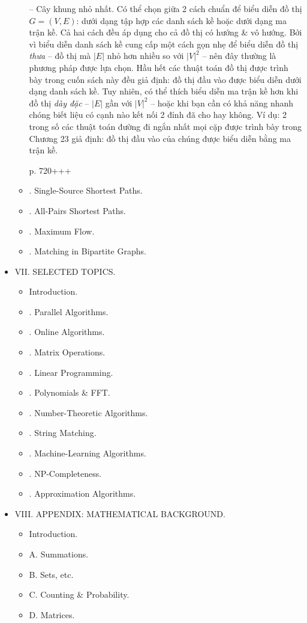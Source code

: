 \documentclass{article}
\begin{document}
\begin{itemize}
\begin{itemize}
		-- {\sf Cây khung nhỏ nhất.} Có thể chọn giữa 2 cách chuẩn để biểu diễn đồ thị $G = (V,E)$: dưới dạng tập hợp các danh sách kề hoặc dưới dạng ma trận kề. Cả hai cách đều áp dụng cho cả đồ thị có hướng \& vô hướng. Bởi vì biểu diễn danh sách kề cung cấp một cách gọn nhẹ để biểu diễn đồ thị {\it thưa} -- đồ thị mà $|E|$ nhỏ hơn nhiều so với $|V|^2$ -- nên đây thường là phương pháp được lựa chọn. Hầu hết các thuật toán đồ thị được trình bày trong cuốn sách này đều giả định: đồ thị đầu vào được biểu diễn dưới dạng danh sách kề. Tuy nhiên, có thể thích biểu diễn ma trận kề hơn khi đồ thị {\it dày đặc} -- $|E|$ gần với $|V|^2$ -- hoặc khi bạn cần có khả năng nhanh chóng biết liệu có cạnh nào kết nối 2 đỉnh đã cho hay không. Ví dụ: 2 trong số các thuật toán đường đi ngắn nhất mọi cặp được trình bày trong Chương 23 giả định: đồ thị đầu vào của chúng được biểu diễn bằng ma trận kề.
		
		p. 720+++
		\item {. Single-Source Shortest Paths.}
		\item {. All-Pairs Shortest Paths.}
		\item {. Maximum Flow.}
		\item {. Matching in Bipartite Graphs.}
	\end{itemize}
	\item {\sf VII. SELECTED TOPICS.}
	\begin{itemize}
		\item {\sf Introduction.}
		\item {. Parallel Algorithms.}
		\item {. Online Algorithms.}
		\item {. Matrix Operations.}
		\item {. Linear Programming.}
		\item {. Polynomials \& FFT.}
		\item {. Number-Theoretic Algorithms.}
		\item {. String Matching.}
		\item {. Machine-Learning Algorithms.}
		\item {. NP-Completeness.}
		\item {. Approximation Algorithms.}
	\end{itemize}
	\item {\sf VIII. APPENDIX: MATHEMATICAL BACKGROUND.}
	\begin{itemize}
		\item {\sf Introduction.}
		\item {\sf A. Summations.}
		\item {\sf B. Sets, etc.}
		\item {\sf C. Counting \& Probability.}
		\item {\sf D. Matrices.}
	\end{itemize}
\end{itemize}
\end{document}
